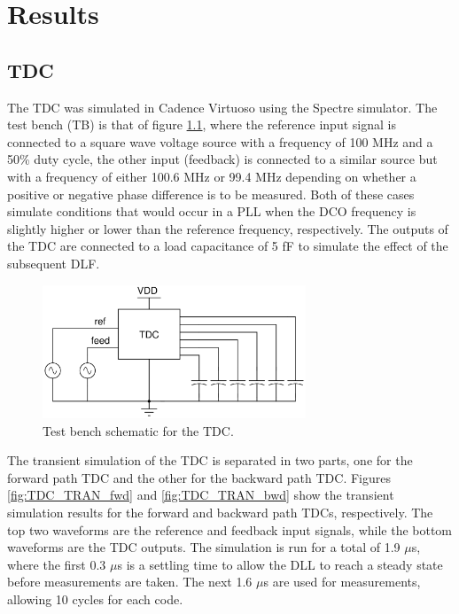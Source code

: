 \chapter{Results}

\section{TDC}
The TDC was simulated in Cadence Virtuoso using the Spectre simulator. The test bench (TB) is that of figure \ref{fig:TB_TDC_Schematic}, where the reference input signal is connected
to a square wave voltage source with a frequency of 100 MHz and a 50\% duty cycle, the other input (feedback) is connected to a similar source but with a frequency of either 100.6 MHz
or 99.4 MHz depending on whether a positive or negative phase difference is to be measured. Both of these cases simulate conditions that would occur in a PLL when the DCO frequency is
slightly higher or lower than the reference frequency, respectively. The outputs of the TDC are connected to a load capacitance of 5 fF to simulate the effect of the subsequent DLF.

\begin{figure}[H]
    \centering
    \includegraphics[width=0.7\textwidth]{figures/TB_TDC.png}
    \caption{Test bench schematic for the TDC.}
    \label{fig:TB_TDC_Schematic}
\end{figure}

The transient simulation of the TDC is separated in two parts, one for the forward path TDC and the other for the backward path TDC. Figures \ref{fig:TDC_TRAN_fwd} and \ref{fig:TDC_TRAN_bwd} show
the transient simulation results for the forward and backward path TDCs, respectively. The top two waveforms are the reference and feedback input signals, while the bottom waveforms are the TDC outputs.
The simulation is run for a total of 1.9 $\mu$s, where the first 0.3 $\mu$s is a settling time to allow the DLL to reach a steady state before measurements are taken. The next 1.6 $\mu$s are used for measurements,
allowing 10 cycles for each code.

